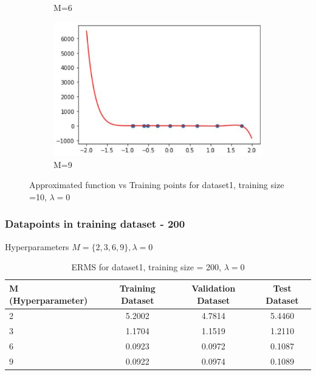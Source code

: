 \documentclass[11pt]{article}
\begin{document}
\begin{figure}[h]
\begin{subfigure}[b]{0.45\textwidth}
	\caption{    M=6}
	\label{fig:fig1.1.1.3}
	\end{subfigure}
	\hfill
	\begin{subfigure}[b]{0.45\textwidth}
	\centering
	\includegraphics[scale=0.7]{dataset1_10_lambda0_m9funcplot.jpg}
	\caption{    M=9}
	\label{fig:fig1.1.1.4}
	\end{subfigure}
\caption{Approximated function vs Training points for dataset1, training size =10, $\lambda = 0$}
\label{fig:fig1.1.1}
\end{figure}

\newpage

\subsubsection{Datapoints in training dataset - 200}
Hyperparameters $M = \{2,3,6,9\}, \lambda = 0$
\begin{table}[h]
\label{tab:tab1.1.2}
\begin{center}
\begin{tabular}{|l|c|c|c|}
\hline
\textbf{M (Hyperparameter)} & \textbf{Training Dataset} & \textbf{Validation Dataset} &\textbf{Test Dataset}\\
\hline
$2$ & 5.2002 & 4.7814 & 5.4460\\
\hline
$3$ & 1.1704 & 1.1519 & 1.2110\\
\hline
$6$ & 0.0923 & 0.0972 & 0.1087\\
\hline
$9$ & 0.0922 & 0.0974 & 0.1089\\
\hline
\end{tabular}
\caption{ERMS for dataset1, training size = 200, $\lambda = 0$}
\end{center}
\end{table}
\end{document}
